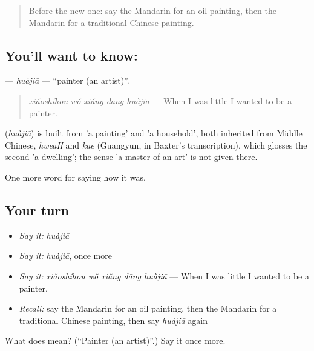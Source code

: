 \begin{quote}
Before the new one: say the Mandarin for an oil painting, then the Mandarin for a traditional Chinese painting.
\end{quote}

\subsection*{You'll want to know: }
\textbf{} — \emph{huàjiā} — \textquotedblleft{}painter (an artist)\textquotedblright{}.

\begin{quote}
\textbf{} \emph{xiǎoshíhou wǒ xiǎng dāng huàjiā} — When I was little I wanted to be a painter.
\end{quote}

\begin{cousinweb}
\textbf{} (\emph{huàjiā}) is built from  'a painting' and  'a household', both inherited from Middle Chinese, \emph{hweaH} and \emph{kae} (Guangyun, in Baxter's transcription), which glosses the second 'a dwelling'; the sense 'a master of an art' is not given there.
\end{cousinweb}

\begin{grammarlens}[title={What you've built}]
One more word for saying how it was.
\end{grammarlens}

\subsection*{Your turn}
\begin{itemize}
\raggedright
  \item \emph{Say it:} \emph{huàjiā}
  \item \emph{Say it:} \emph{huàjiā}, once more
  \item \emph{Say it:} \emph{xiǎoshíhou wǒ xiǎng dāng huàjiā} — When I was little I wanted to be a painter.
  \item \emph{Recall:} say the Mandarin for an oil painting, then the Mandarin for a traditional Chinese painting, then say \emph{huàjiā} again
\end{itemize}

\begin{tcolorbox}[breakable,colback=teal!4,colframe=teal!35!black,title={Before you move on}]
What does  mean? (\textquotedblleft{}Painter (an artist)\textquotedblright{}.) Say it once more.
\end{tcolorbox}
